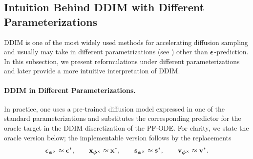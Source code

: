 \subsection{Intuition Behind DDIM with Different Parameterizations}\label{subsec:ddim-different-para}

DDIM is one of the most widely used methods for accelerating diffusion sampling and usually may take in different parametrizations (see ) other than ${\bm{\epsilon}}$-prediction. In this subsection, we present reformulations under different parameterizations and later provide a more intuitive interpretation of DDIM.


\paragraph{DDIM in Different Parameterizations.}
In practice, one uses a pre-trained diffusion model expressed in one of the standard parameterizations and substitutes the corresponding predictor for the oracle target in the DDIM discretization of the PF-ODE. 
For clarity, we state the oracle version below; the implementable version follows by the replacements
\[
\bm{\epsilon}_{\bm{\phi}^\times} \approx \bm{\epsilon}^*, 
\qquad 
{\mathbf{x}}_{\bm{\phi}^\times} \approx {\mathbf{x}}^*, 
\qquad 
{\mathbf{s}}_{\bm{\phi}^\times} \approx {\mathbf{s}}^*, 
\qquad   
{\mathbf{v}}_{\bm{\phi}^\times} \approx {\mathbf{v}}^*.
\]



